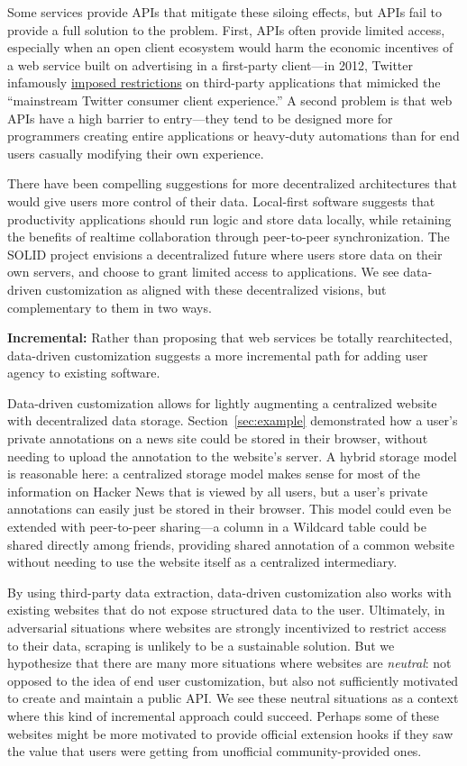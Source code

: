 \documentclass[sigplan,screen,10pt,anonymous,review]{acmart}
\begin{document}
Some services provide APIs that mitigate these siloing effects, but APIs
fail to provide a full solution to the problem. First, APIs often
provide limited access, especially when an open client ecosystem would
harm the economic incentives of a web service built on advertising in a
first-party client---in 2012, Twitter infamously
\href{https://www.theverge.com/2012/8/16/3248079/twitter-limits-app-developers-control}{imposed
restrictions} on third-party applications that mimicked the ``mainstream
Twitter consumer client experience.'' A second problem is that web APIs
have a high barrier to entry---they tend to be designed more for
programmers creating entire applications or heavy-duty automations than
for end users casually modifying their own experience.

There have been compelling suggestions for more decentralized
architectures that would give users more control of their data.
Local-first software \citep{kleppmann2019} suggests that productivity
applications should run logic and store data locally, while retaining
the benefits of realtime collaboration through peer-to-peer
synchronization. The SOLID project \citep{berners-lee2019} envisions a
decentralized future where users store data on their own servers, and
choose to grant limited access to applications. We see data-driven
customization as aligned with these decentralized visions, but
complementary to them in two ways.

\textbf{Incremental:} Rather than proposing that web services be totally
rearchitected, data-driven customization suggests a more incremental
path for adding user agency to existing software.

Data-driven customization allows for lightly augmenting a centralized
website with decentralized data storage. Section~\ref{sec:example}
demonstrated how a user's private annotations on a news site could be
stored in their browser, without needing to upload the annotation to the
website's server. A hybrid storage model is reasonable here: a
centralized storage model makes sense for most of the information on
Hacker News that is viewed by all users, but a user's private
annotations can easily just be stored in their browser. This model could
even be extended with peer-to-peer sharing---a column in a Wildcard
table could be shared directly among friends, providing shared
annotation of a common website without needing to use the website itself
as a centralized intermediary.

By using third-party data extraction, data-driven customization also
works with existing websites that do not expose structured data to the
user. Ultimately, in adversarial situations where websites are strongly
incentivized to restrict access to their data, scraping is unlikely to
be a sustainable solution. But we hypothesize that there are many more
situations where websites are \emph{neutral}: not opposed to the idea of
end user customization, but also not sufficiently motivated to create
and maintain a public API. We see these neutral situations as a context
where this kind of incremental approach could succeed. Perhaps some of
these websites might be more motivated to provide official extension
hooks if they saw the value that users were getting from unofficial
community-provided ones.
\end{document}
